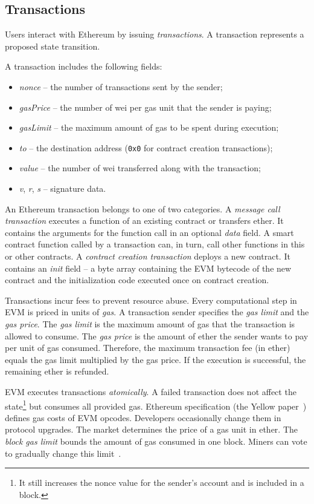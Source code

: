 \subsection{Transactions}

Users interact with Ethereum by issuing \textit{transactions}.
A transaction represents a proposed state transition.

A transaction includes the following fields:
\begin{itemize}
	\item \emph{nonce} -- the number of transactions sent by the sender;
	\item \emph{gasPrice} -- the number of wei per gas unit that the sender is paying;
	\item \emph{gasLimit} -- the maximum amount of gas to be spent during execution;
	\item \emph{to} -- the destination address (\texttt{0x0} for contract creation transactions);
	\item \emph{value} -- the number of wei transferred along with the transaction;
	\item \emph{v}, \emph{r}, \emph{s} -- signature data.
\end{itemize}

An Ethereum transaction belongs to one of two categories.
A \textit{message call transaction} executes a function of an existing contract or transfers ether.
It contains the arguments for the function call in an optional \textit{data} field.
A smart contract function called by a transaction can, in turn, call other functions in this or other contracts.
A \textit{contract creation transaction} deploys a new contract.
It contains an \emph{init} field -- a byte array containing the EVM bytecode of the new contract and the initialization code executed once on contract creation.

Transactions incur fees to prevent resource abuse.
Every computational step in EVM is priced in units of \emph{gas}.
A transaction sender specifies the \textit{gas limit} and the \textit{gas price}.
The \textit{gas limit} is the maximum amount of gas that the transaction is allowed to consume.
The \textit{gas price} is the amount of ether the sender wants to pay per unit of gas consumed.
Therefore, the maximum transaction fee (in ether) equals the gas limit multiplied by the gas price.
If the execution is successful, the remaining ether is refunded.

EVM executes transactions \textit{atomically}.
A failed transaction does not affect the state\footnote{It still increases the nonce value for the sender's account and is included in a block.} but consumes all provided gas.
Ethereum specification (the Yellow paper~\cite{Wood2014}) defines gas costs of EVM opcodes.
Developers occasionally change them in protocol upgrades.
The market determines the price of a gas unit in ether.
The \textit{block gas limit} bounds the amount of gas consumed in one block.
Miners can vote to gradually change this limit~\cite{Jnnk15}.


